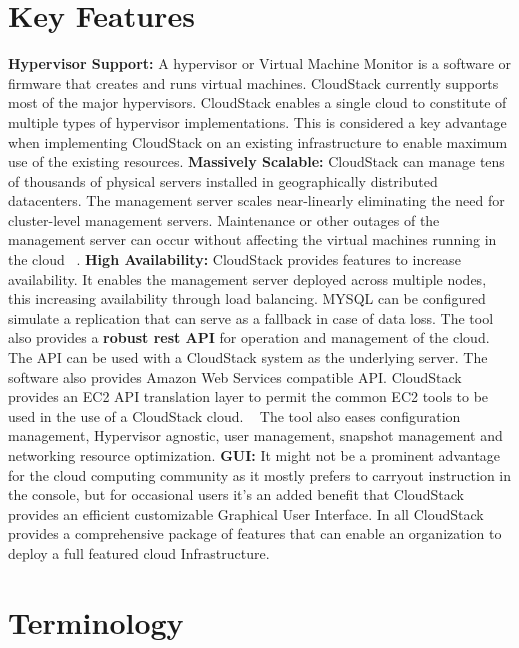 \section{Key Features}
{\bf Hypervisor Support: } A hypervisor or Virtual Machine Monitor is a software or firmware that creates 
and runs virtual machines. CloudStack currently supports most of the major hypervisors.  CloudStack enables 
a single cloud to constitute of multiple types of hypervisor implementations. This is considered a key 
advantage when implementing CloudStack on an existing infrastructure to enable maximum use of the existing 
resources. {\bf Massively Scalable:} CloudStack can manage tens of thousands of physical servers installed
in geographically distributed datacenters. The management server scales near-linearly eliminating the need for
cluster-level management servers. Maintenance or other outages of the management server can occur without
affecting the virtual machines running in the cloud ~\cite{hid-sp18-417-www-cloudstack-scalability}. 
{\bf High Availability:} CloudStack provides features to increase availability. It enables the management server 
deployed across multiple nodes, this increasing availability through load balancing. MYSQL can be configured
simulate a replication that can serve as a fallback in case of data loss. The tool also provides a {\bf robust rest API} 
for operation and management of the cloud. The API can be used with a CloudStack system as the underlying server. 
The software also provides Amazon Web Services compatible API. CloudStack provides an EC2 API translation layer
to permit the common EC2 tools to be used in the use of a CloudStack cloud. ~\cite{hid-sp18-417-www-cloudstack-aws}
The tool also eases configuration management, Hypervisor agnostic, user management, snapshot management and 
networking resource optimization. 
{\bf GUI: } It might not be a prominent advantage for the cloud computing community as it mostly prefers to carryout 
instruction in the console, but for occasional users it’s an added benefit that CloudStack provides an efficient 
customizable Graphical User Interface. In all CloudStack provides a comprehensive package of features that can enable 
an organization to deploy a full featured cloud Infrastructure.

\section{Terminology}

